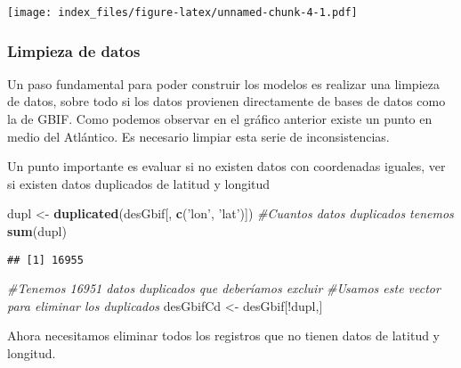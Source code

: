 \documentclass[]{article}
\newenvironment{Shaded}{\begin{snugshade}}{\end{snugshade}}
\newcommand{\KeywordTok}[1]{\textcolor[rgb]{0.13,0.29,0.53}{\textbf{{#1}}}}
\newcommand{\StringTok}[1]{\textcolor[rgb]{0.31,0.60,0.02}{{#1}}}
\newcommand{\CommentTok}[1]{\textcolor[rgb]{0.56,0.35,0.01}{\textit{{#1}}}}
\newcommand{\NormalTok}[1]{{#1}}
\begin{document}
\texttt{[image: index\_files/figure-latex/unnamed-chunk-4-1.pdf]}

\subsubsection{Limpieza de datos}\label{limpieza-de-datos}

Un paso fundamental para poder construir los modelos es realizar una
limpieza de datos, sobre todo si los datos provienen directamente de
bases de datos como la de GBIF. Como podemos observar en el gráfico
anterior existe un punto en medio del Atlántico. Es necesario limpiar
esta serie de inconsistencias.

Un punto importante es evaluar si no existen datos con coordenadas
iguales, ver si existen datos duplicados de latitud y longitud

\begin{Shaded}
\begin{Highlighting}[]
\NormalTok{dupl <-}\StringTok{ }\KeywordTok{duplicated}\NormalTok{(desGbif[, }\KeywordTok{c}\NormalTok{(}\StringTok{'lon'}\NormalTok{, }\StringTok{'lat'}\NormalTok{)])}
\CommentTok{#Cuantos datos duplicados tenemos}
\KeywordTok{sum}\NormalTok{(dupl)}
\end{Highlighting}
\end{Shaded}

\begin{verbatim}
## [1] 16955
\end{verbatim}

\begin{Shaded}
\begin{Highlighting}[]
\CommentTok{#Tenemos 16951 datos duplicados que deberíamos excluir}
\CommentTok{#Usamos este vector para eliminar los duplicados}
\NormalTok{desGbifCd <-}\StringTok{ }\NormalTok{desGbif[!dupl,]}
\end{Highlighting}
\end{Shaded}

Ahora necesitamos eliminar todos los registros que no tienen datos de
latitud y longitud.

\begin{Shaded}
\end{Shaded}
\end{document}
